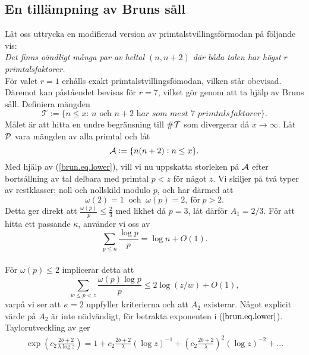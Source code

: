 \subsection{En tillämpning av Bruns såll}
Låt oss uttrycka en modifierad version av primtalstvillingsförmodan på följande vis:\\
\textit{Det finns oändligt många par av heltal $(n,n+2)$ där båda talen har högst $r$ primtalsfaktorer.}\\
För valet $r=1$ erhålls exakt primtalstvillingsfömodan, vilken står obevisad.
Däremot kan påståendet bevisas för $r=7$, vilket \cite{cojocarumurty} gör genom att ta hjälp av Bruns såll.
Definiera mängden
\begin{equation*}
    \mathcal{T} := \{\textit{$n\leq x$: $n$ och $n+2$ har som mest $7$ primtalsfaktorer}\}.
\end{equation*}
Målet är att hitta en undre begränsning till $\card{\mathcal{T}}$ som divergerar då $x\to\infty$.
Låt $\P$ vara mängden av alla primtal och låt
\begin{equation*}
    \A := \{n(n+2): n\leq x\}.
\end{equation*}
Med hjälp av (\ref{brun.eq.lower}), vill vi nu uppskatta storleken på $\A$ efter bortsållning av tal delbara med primtal $p<z$ för något $z$.
Vi skiljer på två typer av restklasser; noll och nollskild modulo $p$, och har därmed att
\begin{equation*}
    \omega(2)=1\ \text{ och }\ \omega(p)=2,\ \text{för}\ p>2.
\end{equation*}
Detta ger direkt att $\frac{\omega(p)}{p}\leq\frac{2}{3}$ med likhet då $p=3$, låt därför $A_1=2/3$.
För att hitta ett passande $\kappa$, använder vi oss av
\begin{equation}\label{brun.eq.sum_logp_over_p}
    \sum_{p\leq n}\frac{\log p}{p} = \log n + O(1).
\end{equation}
 \\ \noindent
För $\omega(p)\leq2$ implicerar detta att
\begin{equation*}
    \sum_{w\leq p<z} \frac{\omega(p)\log p}{p} \leq 2\log\left(z/w\right) + O(1),
\end{equation*}
varpå vi ser att $\kappa=2$ uppfyller kriterierna och att $A_2$ existerar.
Något explicit värde på $A_2$ är inte nödvändigt, för betrakta exponenten i ($\ref{brun.eq.lower}$). Taylorutveckling av ger
\begin{align*}
    \exp\left(c_2\frac{2b+2}{\lambda\log z}\right) = 1 + c_2\frac{2b+2}{\lambda}(\log z)^{-1} + \left(c_2\frac{2b+2}{\lambda}\right)^2(\log z)^{-2} + ...
\end{align*}
